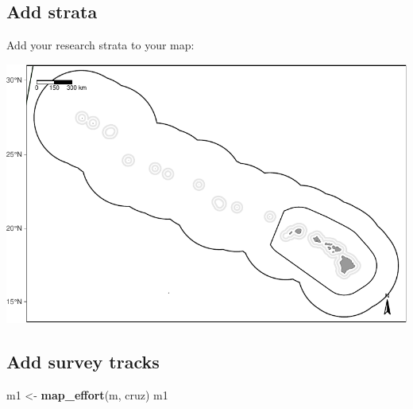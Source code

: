 \documentclass[
]{book}
\newenvironment{Shaded}{\begin{snugshade}}{\end{snugshade}}
\newcommand{\DataTypeTok}[1]{\textcolor[rgb]{0.13,0.29,0.53}{#1}}
\newcommand{\KeywordTok}[1]{\textcolor[rgb]{0.13,0.29,0.53}{\textbf{#1}}}
\newcommand{\NormalTok}[1]{#1}
\newcommand{\OperatorTok}[1]{\textcolor[rgb]{0.81,0.36,0.00}{\textbf{#1}}}
\newcommand{\StringTok}[1]{\textcolor[rgb]{0.31,0.60,0.02}{#1}}
\begin{document}
\hypertarget{add-strata}{%
\subsection*{Add strata}\label{add-strata}}

Add your research strata to your map:

\begin{Shaded}
\end{Shaded}

\includegraphics{figures/unnamed-chunk-53-1.pdf}

\hypertarget{add-survey-tracks}{%
\subsection*{Add survey tracks}\label{add-survey-tracks}}

\begin{Shaded}
\begin{Highlighting}[]
\NormalTok{m1 <-}\StringTok{ }\KeywordTok{map_effort}\NormalTok{(m, cruz)}
\NormalTok{m1}
\end{Highlighting}
\end{Shaded}
\end{document}
